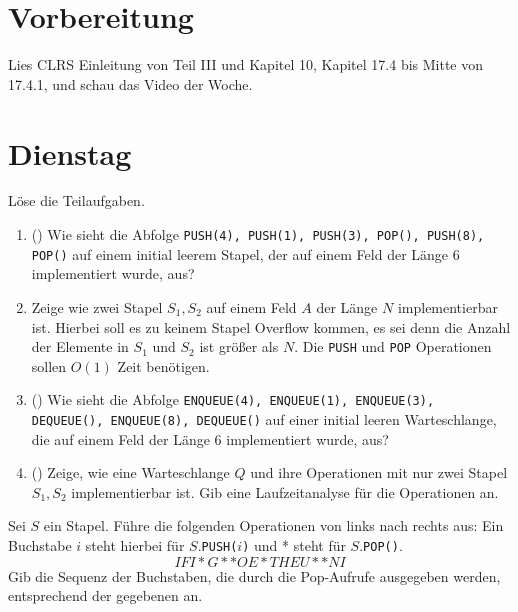 \documentclass{uebung_cs}
\begin{document}
\section*{Vorbereitung}
Lies CLRS Einleitung von Teil III und Kapitel 10, Kapitel 17.4 bis Mitte von 17.4.1, und schau das Video der Woche.

\section*{Dienstag}

\begin{aufgabe}
	Löse die Teilaufgaben.
	\begin{enumerate}
		\item (\warmup) Wie sieht die Abfolge \texttt{PUSH(4), PUSH(1), PUSH(3), POP(), PUSH(8), POP()} auf einem initial leerem Stapel, der auf einem Feld der Länge 6 implementiert wurde, aus?
		\item Zeige wie zwei Stapel $S_1, S_2$ auf einem Feld $A$ der Länge $N$ implementierbar ist.
		Hierbei soll es zu keinem Stapel Overflow kommen, es sei denn die Anzahl der Elemente in $S_1$ und $S_2$ ist größer als $N$.
		Die \texttt{PUSH} und \texttt{POP} Operationen sollen $O(1)$ Zeit benötigen.
		\item (\warmup) Wie sieht die Abfolge \texttt{ENQUEUE(4), ENQUEUE(1), ENQUEUE(3), DEQUEUE(), ENQUEUE(8), DEQUEUE()} auf einer initial leeren Warteschlange, die auf einem Feld der Länge 6 implementiert wurde, aus?
		\item (\hard) Zeige, wie eine Warteschlange $Q$ und ihre Operationen mit nur zwei Stapel $S_1, S_2$ implementierbar ist.
		Gib eine Laufzeitanalyse für die Operationen an.
	\end{enumerate}
\end{aufgabe}

\begin{aufgabe}
	Sei $S$ ein Stapel.
	Führe die folgenden Operationen von links nach rechts aus: Ein Buchstabe $i$ steht hierbei für $S.$\texttt{PUSH(}$i$\texttt{)} und * steht für $S.$\texttt{POP()}.
	\[IFI*G**OE*THEU**NI\]
	Gib die Sequenz der Buchstaben, die durch die Pop-Aufrufe ausgegeben werden, entsprechend der gegebenen an.
\end{aufgabe}
\end{document}
